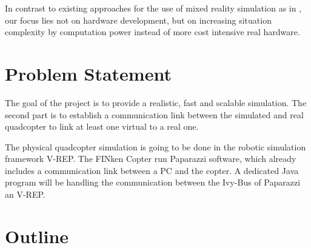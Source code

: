 In contrast to existing approaches for the use of mixed reality simulation as in \cite{Chen2011}, our focus lies not on hardware development, but on increasing situation complexity by computation power instead of more cost intensive real hardware.




       


  
\section{Problem Statement}
    The goal of the project is to provide a realistic, fast and scalable simulation. The second part is to establish a communication link between the simulated and real quadcopter to link at least one virtual to a real one.

The physical quadcopter simulation is going to be done in the robotic simulation framework V-REP. The FINken Copter run Paparazzi software, which already includes a communication link between a PC and the copter. A dedicated Java program will be handling the communication between the Ivy-Bus of Paparazzi an V-REP. 


 
         
\section{Outline}
    
   